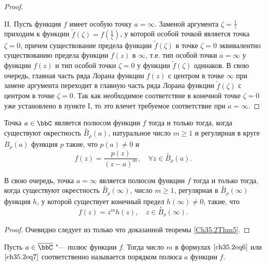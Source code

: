 \begin{proof}
\begin{enumerate}
\end{enumerate}

II. Пусть функция $f$ имеет особую точку $a = \infty$. Заменой аргумента $\zeta = \frac{1}{z}$ приходим к функции $\widetilde{f}(\zeta) = f(\frac{1}{\zeta})$, у которой особой точкой является точка $\zeta = 0$, причем существование предела функции $\widetilde{f}(\zeta)$ в точке $\zeta = 0$ эквивалентно существованию предела функции $f(z)$ в $\infty$, т.е. тип особой точки $a = \infty$ у функции $f(z)$ и тип особой точки $\zeta = 0$ у функции $\widetilde{f}(\zeta)$ одинаков. В свою очередь, главная часть ряда Лорана функции $f(z)$ с центром в точке $\infty$ при замене аргумента переходит в главную часть ряда Лорана функции $\widetilde{f}(\zeta)$ с центром в точке $\zeta = 0$. Так как необходимое соответствие в конечной точке $\zeta = 0$ уже установлено в пункте I, то это влечет требуемое соответствие при $a  =\infty$.

\end{proof}

\begin{cons} \label{ch35.2cons1}
Точка $a \in \bbC$ является полюсом функции $f$ тогда и только тогда, когда существуют окрестность $\overset{\circ}{B}_\rho(a)$, натуральное число $m \ge 1$ и регулярная в круге $B_\rho(a)$ функция $p$ такие, что $p(a) \not = 0$ и
\begin{equation} \label{ch35.2eq6}
f(z) = \frac{p(z)}{(z - a)^m}, \quad \forall z \in \overset{\circ}{B}_\rho(a).
\end{equation}

В свою очередь, точка $a = \infty$ является полюсом функции $f$ тогда и только тогда, когда существуют окрестность $\overset{\circ}{B}_\rho(\infty)$, число $m \ge 1$, регулярная в $\overset{\circ}{B}_\rho(\infty)$ функция $h$, у которой существует конечный предел $h(\infty) \not= 0$, такие, что
\begin{equation} \label{ch35.2eq7}
f(z) = z^m h(z), \quad z \in \overset{\circ}{B}_\rho(\infty).
\end{equation}

\end{cons}

\begin{proof}
Очевидно следует из только что доказанной теоремы \ref{Ch35.2Thm5}.
\end{proof}

\begin{defn}
Пусть $a \in \overline{\bbC}$ "--- полюс функции $f$. Тогда число $m$ в формулах $\eqref{ch35.2eq6}$ или $\eqref{ch35.2eq7}$ соответственно называется порядком полюса $a$ функции $f$.
\end{defn}

